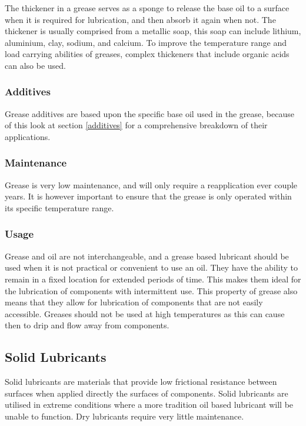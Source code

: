 \documentclass[a4paper,11pt]{article}
\begin{document}
The thickener in a grease serves as a sponge to release the base oil to a surface when it is required for lubrication, and then absorb it again when not. The thickener is usually comprised from a metallic soap, this soap can include lithium, aluminium, clay, sodium, and calcium. To improve the temperature range and load carrying abilities of greases, complex thickeners that include organic acids can also be used.

\subsubsection{Additives}

Grease additives are based upon the specific base oil used in the grease, because of this look at section \ref{additives} for a comprehensive breakdown of their applications.

\subsubsection{Maintenance}

Grease is very low maintenance, and will only require a reapplication ever couple years. It is however important to ensure that the grease is only operated within its specific temperature range. 

\subsubsection{Usage}

Grease and oil are not interchangeable, and a grease based lubricant should be used when it is not practical or convenient to use an oil. They have the ability to remain in a fixed location for extended periods of time. This makes them ideal for the lubrication of components with intermittent use. This property of grease also means that they allow for lubrication of components that are not easily accessible. Greases should not be used at high temperatures as this can cause then to drip and flow away from components.

\subsection{Solid Lubricants}

Solid lubricants are materials that provide low frictional resistance between surfaces when applied directly the surfaces of components. Solid lubricants are utilised in extreme conditions where a more tradition oil based lubricant will be unable to function. Dry lubricants require very little maintenance. 
\end{document}
